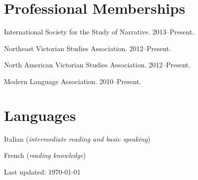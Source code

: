 \documentclass[10pt,letterpaper]{article}
\renewenvironment{itemize}{
  \begin{list}{}{
    \setlength{\leftmargin}{1.5em}
    \setlength{\itemsep}{0.25em}
    \setlength{\parskip}{0pt}
    \setlength{\parsep}{0.25em}
  }
}{
  \end{list}
}
\begin{document}

\section*{Professional Memberships}

\begin{itemize}
\item International Society for the Study of Narrative. 2013--Present.
\item Northeast Victorian Studies Association. 2012--Present.
\item North American Victorian Studies Association. 2012--Present.
\item Modern Language Association. 2010--Present.
\end{itemize}


\section*{Languages}

\begin{itemize}
\item Italian (\emph{intermediate reading and basic speaking})\\
\item French (\emph{reading knowledge})
\end{itemize}
\vfill{} %


\begin{center}
{\scriptsize Last updated: \today\- } %
\end{center}

\end{document}
